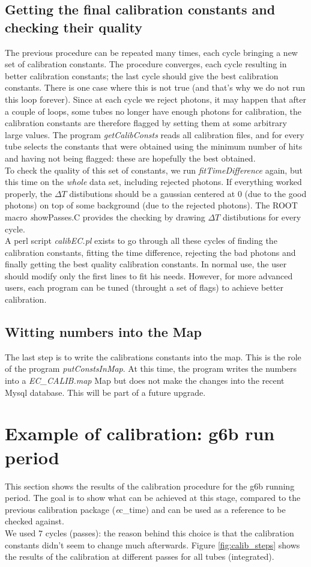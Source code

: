 \documentclass [12pt,letterpaper]{article}
\begin{document}
\subsection{Getting the final calibration constants and checking their quality}
The previous procedure can be repeated many times, each cycle bringing a new set of calibration constants. The procedure converges, each cycle resulting in better calibration constants; the last cycle should give the best calibration constants. There is one case where this is not true (and that's why we do not run this loop forever). Since at each cycle we reject photons, it may happen that after a couple of loops, some tubes no longer have enough photons for calibration, the calibration constants are therefore flagged by setting them at some arbitrary large values. The program {\it getCalibConsts} reads all calibration files, and for every tube selects the constants that were obtained using the minimum number of hits and having not being flagged: these are hopefully the best obtained.\\
To check the quality of this set of constants, we run {\it fitTimeDifference} again, but this time on the {\it whole} data set, including rejected photons. If everything worked properly, the $\Delta T$ distibutions should be a gaussian centered at 0 (due to the good photons) on top of some background (due to the rejected photons). The ROOT macro {\emph showPasses.C} provides the checking by drawing $\Delta T$ distibutions for every cycle.
\\
A perl script {\it calibEC.pl} exists to go through all these cycles of finding the calibration constants, fitting the time difference, rejecting the bad photons and finally getting the best quality calibration constants. In normal use, the user should modify only the first lines to fit his needs. However, for more advanced users, each program can be tuned (throught a set of flags) to achieve better calibration.


\subsection{Witting numbers into the Map}
The last step is to write the calibrations constants into the map. This is the role of the program {\it putConstsInMap}. At this time, the program writes the numbers into a {\it EC\_CALIB.map} Map but does not make the changes into the recent Mysql database. This will be part of a future upgrade.

\section{Example of calibration: g6b run period}
This section shows the results of the calibration procedure for the g6b running period. The goal is to show what can be achieved at this stage, compared to the previous calibration package ({\emph ec\_time}) and can be used as a reference to be checked against.\\
We used 7 cycles (passes): the reason behind this choice is that the calibration constants didn't seem to change much afterwards. Figure  \ref{fig:calib_steps} shows the results of the calibration at different passes for all tubes (integrated).
\end{document}
